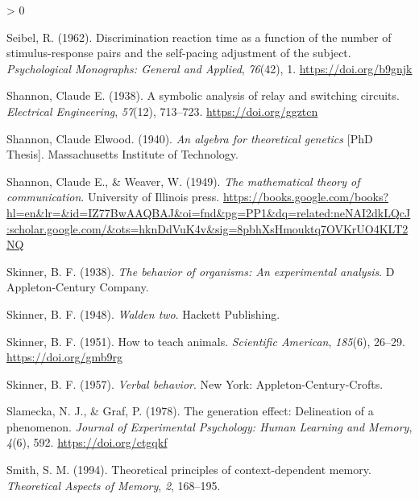 \documentclass[
  oneside,
  12pt]{crumpbook}
\newlength{\cslhangindent}
\newenvironment{CSLReferences}[2] %
 {%
  \setlength{\parindent}{0pt}
  \ifodd #1 \everypar{\setlength{\hangindent}{\cslhangindent}}\ignorespaces\fi
  \ifnum #2 > 0
  \setlength{\parskip}{#2\baselineskip}
  \fi
 }%
 {}
\begin{document}
\begin{CSLReferences}{1}{0}
\leavevmode\hypertarget{ref-seibelDiscriminationReactionTime1962}{}%
Seibel, R. (1962). Discrimination reaction time as a function of the number of stimulus-response pairs and the self-pacing adjustment of the subject. \emph{Psychological Monographs: General and Applied}, \emph{76}(42), 1. \url{https://doi.org/b9gnjk}

\leavevmode\hypertarget{ref-shannonSymbolicAnalysisRelay1938}{}%
Shannon, Claude E. (1938). A symbolic analysis of relay and switching circuits. \emph{Electrical Engineering}, \emph{57}(12), 713--723. \url{https://doi.org/ggztcn}

\leavevmode\hypertarget{ref-shannonAlgebraTheoreticalGenetics1940}{}%
Shannon, Claude Elwood. (1940). \emph{An algebra for theoretical genetics} {[}PhD Thesis{]}. {Massachusetts Institute of Technology}.

\leavevmode\hypertarget{ref-shannonMathematicalTheoryCommunication1949}{}%
Shannon, Claude E., \& Weaver, W. (1949). \emph{The mathematical theory of communication}. {University of Illinois press}. \url{https://books.google.com/books?hl=en\&lr=\&id=IZ77BwAAQBAJ\&oi=fnd\&pg=PP1\&dq=related:neNAI2dkLQcJ:scholar.google.com/\&ots=hknDdVuK4v\&sig=8pbhXsHmouktq7OVKrUO4KLT2NQ}

\leavevmode\hypertarget{ref-skinnerBehaviorOrganismsExperimental1938}{}%
Skinner, B. F. (1938). \emph{The behavior of organisms: {An} experimental analysis}. {D Appleton-Century Company}.

\leavevmode\hypertarget{ref-skinnerWaldenTwo1948}{}%
Skinner, B. F. (1948). \emph{Walden two}. {Hackett Publishing}.

\leavevmode\hypertarget{ref-skinnerHowTeachAnimals1951}{}%
Skinner, B. F. (1951). How to teach animals. \emph{Scientific American}, \emph{185}(6), 26--29. \url{https://doi.org/gmb9rg}

\leavevmode\hypertarget{ref-skinnerVerbalBehavior1957}{}%
Skinner, B. F. (1957). \emph{Verbal behavior}. {New York: Appleton-Century-Crofts}.

\leavevmode\hypertarget{ref-slameckaGenerationEffectDelineation1978a}{}%
Slamecka, N. J., \& Graf, P. (1978). The generation effect: {Delineation} of a phenomenon. \emph{Journal of Experimental Psychology: Human Learning and Memory}, \emph{4}(6), 592. \url{https://doi.org/ctgqkf}

\leavevmode\hypertarget{ref-smithTheoreticalPrinciplesContextdependent1994}{}%
Smith, S. M. (1994). Theoretical principles of context-dependent memory. \emph{Theoretical Aspects of Memory}, \emph{2}, 168--195.


\end{CSLReferences}
\end{document}
